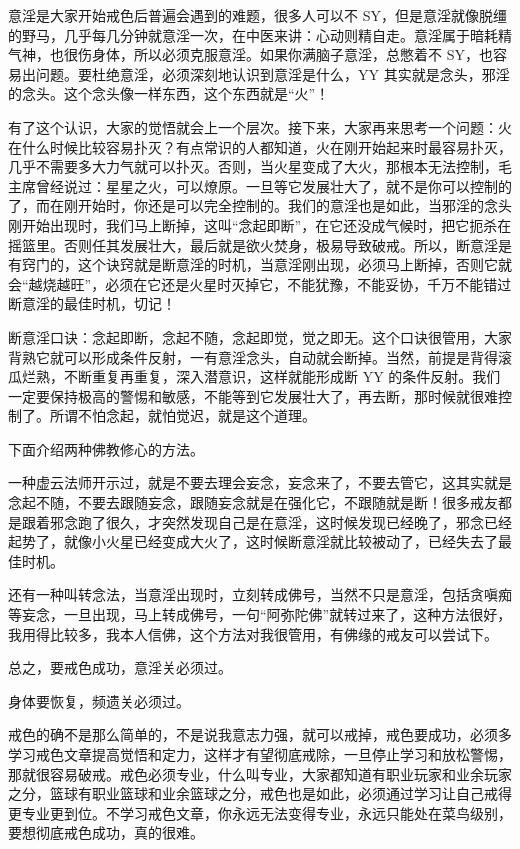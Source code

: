 \documentclass[fontset=founder]{ctexart}
\begin{document}
意淫是大家开始戒色后普遍会遇到的难题，很多人可以不 SY，但是意淫就像脱缰的野马，几乎每几分钟就意淫一次，在中医来讲：心动则精自走。意淫属于暗耗精气神，也很伤身体，所以必须克服意淫。如果你满脑子意淫，总憋着不 SY，也容易出问题。要杜绝意淫，必须深刻地认识到意淫是什么，YY 其实就是念头，邪淫的念头。这个念头像一样东西，这个东西就是“火”！

有了这个认识，大家的觉悟就会上一个层次。接下来，大家再来思考一个问题：火在什么时候比较容易扑灭？有点常识的人都知道，火在刚开始起来时最容易扑灭，几乎不需要多大力气就可以扑灭。否则，当火星变成了大火，那根本无法控制，毛主席曾经说过：星星之火，可以燎原。一旦等它发展壮大了，就不是你可以控制的了，而在刚开始时，你还是可以完全控制的。我们的意淫也是如此，当邪淫的念头刚开始出现时，我们马上断掉，这叫“念起即断”，在它还没成气候时，把它扼杀在摇篮里。否则任其发展壮大，最后就是欲火焚身，极易导致破戒。所以，断意淫是有窍门的，这个诀窍就是断意淫的时机，当意淫刚出现，必须马上断掉，否则它就会“越烧越旺”，必须在它还是火星时灭掉它，不能犹豫，不能妥协，千万不能错过断意淫的最佳时机，切记！

断意淫口诀：念起即断，念起不随，念起即觉，觉之即无。这个口诀很管用，大家背熟它就可以形成条件反射，一有意淫念头，自动就会断掉。当然，前提是背得滚瓜烂熟，不断重复再重复，深入潜意识，这样就能形成断 YY 的条件反射。我们一定要保持极高的警惕和敏感，不能等到它发展壮大了，再去断，那时候就很难控制了。所谓不怕念起，就怕觉迟，就是这个道理。

下面介绍两种佛教修心的方法。

一种虚云法师开示过，就是不要去理会妄念，妄念来了，不要去管它，这其实就是念起不随，不要去跟随妄念，跟随妄念就是在强化它，不跟随就是断！很多戒友都是跟着邪念跑了很久，才突然发现自己是在意淫，这时候发现已经晚了，邪念已经起势了，就像小火星已经变成大火了，这时候断意淫就比较被动了，已经失去了最佳时机。

还有一种叫转念法，当意淫出现时，立刻转成佛号，当然不只是意淫，包括贪嗔痴等妄念，一旦出现，马上转成佛号，一句“阿弥陀佛”就转过来了，这种方法很好，我用得比较多，我本人信佛，这个方法对我很管用，有佛缘的戒友可以尝试下。

总之，要戒色成功，意淫关必须过。

身体要恢复，频遗关必须过。

戒色的确不是那么简单的，不是说我意志力强，就可以戒掉，戒色要成功，必须多学习戒色文章提高觉悟和定力，这样才有望彻底戒除，一旦停止学习和放松警惕，那就很容易破戒。戒色必须专业，什么叫专业，大家都知道有职业玩家和业余玩家之分，篮球有职业篮球和业余篮球之分，戒色也是如此，必须通过学习让自己戒得更专业更到位。不学习戒色文章，你永远无法变得专业，永远只能处在菜鸟级别，要想彻底戒色成功，真的很难。
\end{document}
